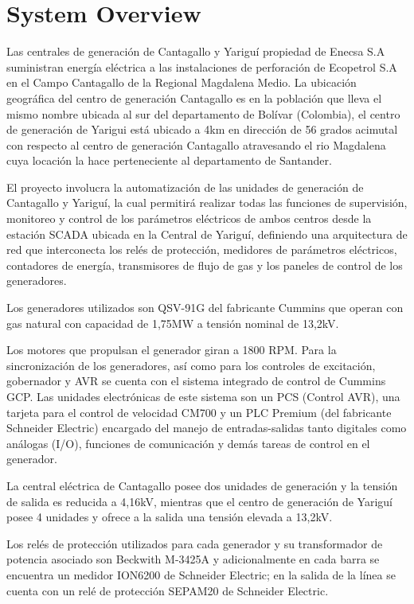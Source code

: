 
\section{System Overview}

Las centrales de generación de Cantagallo y Yariguí propiedad de Enecsa
S.A suministran energía eléctrica a las instalaciones de perforación
de Ecopetrol S.A en el Campo Cantagallo de la Regional Magdalena Medio.
La ubicación geográfica del centro de generación Cantagallo es en la
población que lleva el mismo nombre ubicada al sur del departamento de
Bolívar (Colombia), el centro de generación de Yarigui está ubicado a
4km en dirección de 56 grados acimutal con respecto al centro de
generación Cantagallo atravesando el rio Magdalena cuya locación la
hace perteneciente al departamento de Santander.

El proyecto involucra la automatización de las unidades de generación de Cantagallo y Yariguí, la cual  permitirá realizar todas las funciones de supervisión, monitoreo y control de los parámetros eléctricos de ambos centros desde la estación SCADA ubicada en la Central de Yariguí, definiendo una arquitectura de red que interconecta los relés de protección, medidores de parámetros eléctricos, contadores de energía, transmisores de flujo de gas y los paneles de control de los generadores.

Los generadores utilizados son QSV-91G del fabricante Cummins que operan con gas natural con capacidad de 1,75MW a tensión nominal de 13,2kV.

Los motores que propulsan el generador giran a 1800 RPM. Para la sincronización de los generadores, así como para los controles de excitación, gobernador y AVR se cuenta con el sistema integrado de control de Cummins GCP. Las unidades electrónicas de este sistema son un PCS (Control AVR), una tarjeta para el control de velocidad CM700 y un PLC Premium (del fabricante Schneider Electric) encargado del manejo de entradas-salidas tanto digitales como análogas (I/O), funciones de comunicación y demás tareas de control en el generador.

La central eléctrica de Cantagallo posee dos unidades de generación y la tensión de salida es reducida a 4,16kV, mientras que el centro de generación de Yariguí posee 4 unidades y ofrece a la salida una tensión elevada a 13,2kV. 

Los relés de protección utilizados para cada generador y su transformador de potencia asociado son Beckwith M-3425A y adicionalmente en cada barra se encuentra un medidor ION6200 de Schneider Electric; en la salida de la línea se cuenta con un relé de protección SEPAM20 de Schneider Electric.

